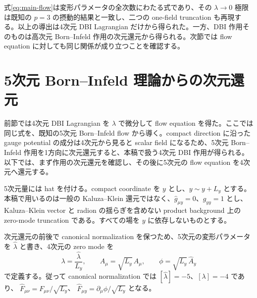 \documentclass[a4paper,11pt]{ltjsarticle}
\numberwithin{equation}{section}
\begin{document}
式\eqref{eq:main-flow}は変形パラメータの全次数にわたる式であり、その $\lambda\to0$ 極限は既知の $p=3$ の摂動的結果と一致し、二つの one-field truncation も再現する。以上の導出は4次元 DBI Lagrangian だけから得られた。一方、DBI 作用そのものは高次元 Born--Infeld 作用の次元還元から得られる。次節では flow equation に対しても同じ関係が成り立つことを確認する。

\section{5次元 Born--Infeld 理論からの次元還元}
\label{sec:reduction}

前節では4次元 DBI Lagrangian を $\lambda$ で微分して flow equation を得た。ここでは同じ式を、既知の5次元 Born--Infeld flow から導く。compact direction に沿った gauge potential の成分は4次元から見ると scalar field になるため、5次元 Born--Infeld 作用を1方向に次元還元すると、本稿で扱う4次元 DBI 作用が得られる。以下では、まず作用の次元還元を確認し、その後に5次元の flow equation を4次元へ還元する。

5次元量には hat を付ける。compact coordinate を $y$ とし、$y\sim y+L_y$ とする。本稿で用いるのは一般の Kaluza--Klein 還元ではなく、$\widehat g_{\mu y}=0$、$\widehat g_{yy}=1$ とし、Kaluza--Klein vector と radion の揺らぎを含めない product background 上の zero-mode truncation である。すべての場を $y$ に依存しないものとする。

次元還元の前後で canonical normalization を保つため、5次元の変形パラメータを $\widehat\lambda$ と書き、4次元の zero mode を
\begin{equation}
 \lambda=\frac{\widehat\lambda}{L_y},
 \qquad
 A_\mu=\sqrt{L_y}\,\widehat A_\mu,
 \qquad
 \phi=\sqrt{L_y}\,\widehat A_y
 \label{eq:reduction-rescaling}
\end{equation}
で定義する。従って canonical normalization では
$[\widehat\lambda]=-5$、$[\lambda]=-4$ であり、
$\widehat F_{\mu\nu}=F_{\mu\nu}/\sqrt{L_y}$、
$\widehat F_{\mu y}=\partial_\mu\phi/\sqrt{L_y}$ となる。
\end{document}
